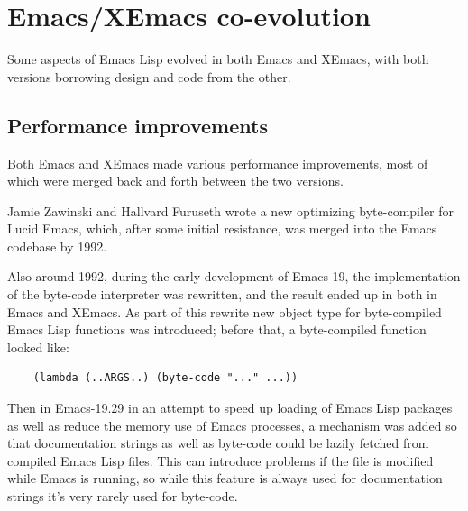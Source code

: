 \documentclass[format=acmsmall, review]{acmart}
\newcommand \Elisp {Emacs Lisp}
\begin{document}
\section{Emacs/XEmacs co-evolution}
\label{sec:coevolution}

Some aspects of \Elisp{} evolved in both Emacs and XEmacs, with both
versions borrowing design and code from the other.

\subsection{Performance improvements}

Both Emacs and XEmacs made various performance improvements, most of
which were merged back and forth between the two versions.

Jamie Zawinski and Hallvard Furuseth wrote a new optimizing
byte-compiler for Lucid Emacs, which, after some initial resistance, was
merged into the Emacs codebase by 1992.

Also around 1992, during the early development of Emacs-19, the
implementation of the byte-code interpreter was rewritten, and the
result ended up in both in Emacs and XEmacs.
As part of this rewrite new object type for byte-compiled \Elisp{}
functions was introduced; before that, a byte-compiled function looked
like:
\begin{verbatim}
    (lambda (..ARGS..) (byte-code "..." ...))
\end{verbatim}
Then in Emacs-19.29 in an attempt to speed up loading of \Elisp{} packages
as well as reduce the memory use of Emacs processes, a mechanism was added
so that documentation strings as well as byte-code could be lazily fetched
from compiled \Elisp{} files.  This can introduce problems if the file is
modified while Emacs is running, so while this feature is always used
for documentation strings it's very rarely used for byte-code.

\end{document}
